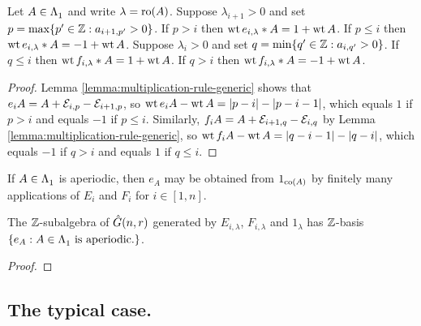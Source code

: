 \documentclass[a4paper, 11pt]{report}
\begin{document}
\begin{lemma}\label{lemma:decreasing-weight}
Let $A\in\Lambda_1^{}$ and write $\lambda=\operatorname{ro}(A)$. Suppose $\lambda_{i+1}>0$ and set $p=\max\{p'\in\mathbb{Z}: a_{i+1,p'}>0\}$. If $p>i$ then $\operatorname{wt}{e_{i,\lambda}\ast A}=1+\operatorname{wt}{A}$. If $p\le i$ then $\operatorname{wt}{e_{i,\lambda}\ast A}=-1+\operatorname{wt}{A}$. Suppose $\lambda_i>0$ and set $q=\min\{q'\in\mathbb{Z}: a_{i,q'}>0\}$. If $q\le i$ then $\operatorname{wt}{f_{i,\lambda}\ast A}=1+\operatorname{wt}{A}$. If $q>i$ then $\operatorname{wt}{f_{i,\lambda}\ast A}=-1+\operatorname{wt}{A}$.
\end{lemma}

\begin{proof}
Lemma \ref{lemma:multiplication-rule-generic} shows that $e_iA = A+\mathcal{E}_{i,p}-\mathcal{E}_{i+1,p}$, so $\operatorname{wt}{e_iA} - \operatorname{wt}{A} = |p-i| - |p-i-1|$, which equals $1$ if $p>i$ and equals $-1$ if $p\le i$. Similarly, $f_iA = A + \mathcal{E}_{i+1,q} - \mathcal{E}_{i,q}$ by Lemma \ref{lemma:multiplication-rule-generic}, so $\operatorname{wt}{f_iA} - \operatorname{wt}{A} = |q-i-1| - |q-i|$, which equals $-1$ if $q>i$ and equals $1$ if $q\le i$.
\end{proof}

\begin{lemma}\label{lemma:factorising-aperiodic-elements}
If $A\in\Lambda_1^{}$ is aperiodic, then $e_A$ may be obtained from $1_{\operatorname{co}(A)}$ by finitely many applications of $E_i$ and $F_i$ for $i\in[1,n]$.
\end{lemma}

\begin{proposition}
The $\mathbb{Z}$-subalgebra of $\hat{G}(n,r)$ generated by $E_{i,\lambda}$, $F_{i,\lambda}$ and $1_\lambda$ has $\mathbb{Z}$-basis $\{e_A:A\in\Lambda_1^{}\text{ is aperiodic.}\}$.
\end{proposition}

\begin{proof}

\end{proof}

\subsection{The typical case.}
\end{document}
